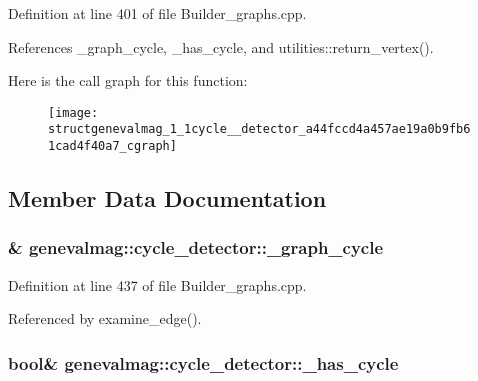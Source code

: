 Definition at line 401 of file Builder\_\-graphs.cpp.



References \_\-graph\_\-cycle, \_\-has\_\-cycle, and utilities::return\_\-vertex().



Here is the call graph for this function:\nopagebreak
\begin{figure}[H]
\begin{center}
\leavevmode
\texttt{[image: structgenevalmag\_1\_1cycle\_\_detector\_a44fccd4a457ae19a0b9fb61cad4f40a7\_cgraph]}
\end{center}
\end{figure}




\subsection{Member Data Documentation}
\hypertarget{structgenevalmag_1_1cycle__detector_a7ea4fce7ca4725c4734493281f3742b0}{
\subsubsection[{\_\-graph\_\-cycle}]{\& {\bf genevalmag::cycle\_\-detector::\_\-graph\_\-cycle}}}
\label{structgenevalmag_1_1cycle__detector_a7ea4fce7ca4725c4734493281f3742b0}


Definition at line 437 of file Builder\_\-graphs.cpp.



Referenced by examine\_\-edge().

\hypertarget{structgenevalmag_1_1cycle__detector_afbb82ee351ec3962b57fcf2b0d21b3b4}{
\subsubsection[{\_\-has\_\-cycle}]{\setlength{\rightskip}{0pt plus 5cm}bool\& {\bf genevalmag::cycle\_\-detector::\_\-has\_\-cycle}}}
\label{structgenevalmag_1_1cycle__detector_afbb82ee351ec3962b57fcf2b0d21b3b4}


